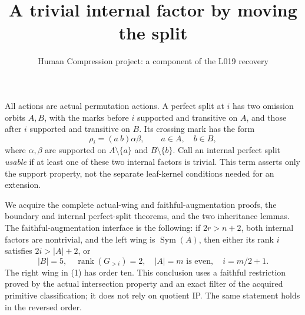 \documentclass[11pt,a4paper]{article}
\title{A trivial internal factor by moving the split}
\author{Human Compression project: a component of the L019 recovery}
\date{}
\newcommand{\Sym}{\operatorname{Sym}}
\begin{document}
\maketitle
All actions are actual permutation actions. A perfect split at $i$
has two omission orbits $A,B$, with the marks before $i$ supported
and transitive on $A$, and those after $i$ supported and transitive
on $B$. Its crossing mark has the form
\[
 \rho_i=(a\ b)\alpha\beta,
 \qquad a\in A,\quad b\in B,
\]
where $\alpha,\beta$ are supported on $A\setminus\{a\}$ and
$B\setminus\{b\}$. Call an internal perfect split \emph{usable}
if at least one of these two internal factors is trivial. This term
asserts only the support property, not the separate leaf-kernel
conditions needed for an extension.

We acquire the complete actual-wing and faithful-augmentation proofs,
the boundary and internal perfect-split theorems, and the two
inheritance lemmas. The faithful-augmentation interface is the following:
if $2r>n+2$, both internal factors are nontrivial, and the left wing
is $\Sym(A)$, then either its rank $i$ satisfies $2i>|A|+2$, or
\[
 |B|=5,\quad \operatorname{rank}(G_{>i})=2,\quad
 |A|=m\text{ is even},\quad i=m/2+1.                 \tag{1}
\]
The right wing in (1) has order ten. This conclusion uses a faithful
restriction proved by the actual intersection property and an exact
filter of the acquired primitive classification; it does not rely
on quotient IP. The same statement holds in the reversed order.
\end{document}
